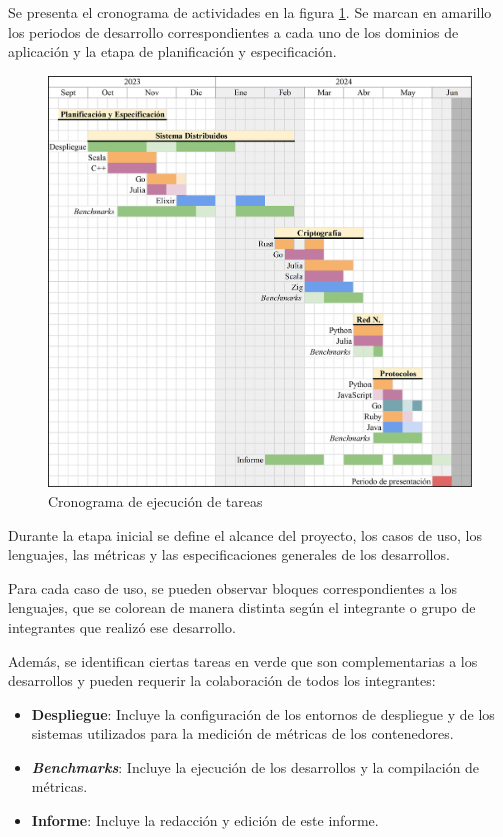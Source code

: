 \documentclass[11pt]{article}
\newcommand{\english}[1]{\textit{#1}}
\begin{document}
Se presenta el cronograma de actividades en la figura \ref{tab:anex:cron}. Se marcan en amarillo los periodos de desarrollo correspondientes a cada uno de los dominios de aplicación y la etapa de planificación y especificación.

\begin{figure}
    \centering
    \includegraphics[width=\textwidth]{resources/cronograma.jpg}
    \caption{Cronograma de ejecución de tareas}
    \label{tab:anex:cron}
\end{figure}

Durante la etapa inicial se define el alcance del proyecto, los casos de uso, los lenguajes, las métricas y las especificaciones generales de los desarrollos.

Para cada caso de uso, se pueden observar bloques correspondientes a los lenguajes, que se colorean de manera distinta según el integrante o grupo de integrantes que realizó ese desarrollo.

Además, se identifican ciertas tareas en verde que son complementarias a los desarrollos y pueden requerir la colaboración de todos los integrantes:
\begin{itemize}
    \item \textbf{Despliegue}: Incluye la configuración de los entornos de despliegue y de los sistemas utilizados para la medición de métricas de los contenedores.
    \item \textbf{\english{Benchmarks}}: Incluye la ejecución de los desarrollos y la compilación de métricas.
    \item \textbf{Informe}: Incluye la redacción y edición de este informe.
\end{itemize}
\end{document}
